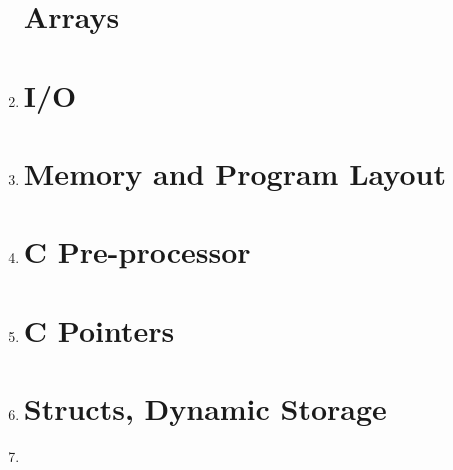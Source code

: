 \documentclass[11pt]{article}
\begin{document}
\begin{enumerate}
\pagebreak

\section*{Arrays}
	
	\item 

\section*{I/O}

	\item 

\pagebreak

\section*{Memory and Program Layout}

	\item 

\section*{C Pre-processor}

	\item 

\newpage
\section*{C Pointers}

	\item 

\pagebreak
\section*{Structs, Dynamic Storage}

	\item 

\end{enumerate}
\end{document}
